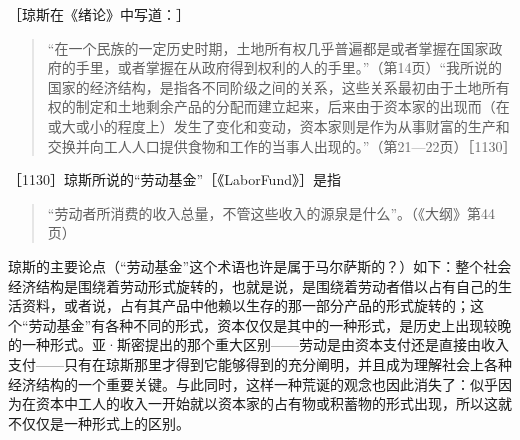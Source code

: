 ［琼斯在《绪论》中写道：］

\begin{quote}{“在一个民族的一定历史时期，土地所有权几乎普遍都是或者掌握在国家政府的手里，或者掌握在从政府得到权利的人的手里。”（第14页）“我所说的国家的经济结构，是指各不同阶级之间的关系，这些关系最初由于土地所有权的制定和土地剩余产品的分配而建立起来，后来由于资本家的出现而（在或大或小的程度上）发生了变化和变动，资本家则是作为从事财富的生产和交换并向工人人口提供食物和工作的当事人出现的。”（第21—22页）［1130］}\end{quote}

［1130］琼斯所说的“劳动基金”［《LaborFund》］是指

\begin{quote}{“劳动者所消费的收入总量，不管这些收入的源泉是什么”。（《大纲》第44页）}\end{quote}

琼斯的主要论点（“劳动基金”这个术语也许是属于马尔萨斯的？）如下：整个社会经济结构是围绕着劳动形式旋转的，也就是说，是围绕着劳动者借以占有自己的生活资料，或者说，占有其产品中他赖以生存的那一部分产品的形式旋转的；这个“劳动基金”有各种不同的形式，资本仅仅是其中的一种形式，是历史上出现较晚的一种形式。亚·斯密提出的那个重大区别——劳动是由资本支付还是直接由收入支付——只有在琼斯那里才得到它能够得到的充分阐明，并且成为理解社会上各种经济结构的一个重要关键。与此同时，这样一种荒诞的观念也因此消失了：似乎因为在资本中工人的收入一开始就以资本家的占有物或积蓄物的形式出现，所以这就不仅仅是一种形式上的区别。

